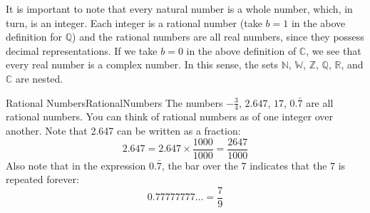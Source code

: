 It is important to note that every natural number is a whole number, which, in turn, is an integer.   Each integer is a rational number (take $b =1$ in the above definition for $\mathbb Q$) and the rational numbers are all real numbers, since they possess decimal representations.   If we take $b=0$ in the above definition of $\mathbb C$, we see that every real number is a complex number.  In this sense, the sets $\mathbb N$, $\mathbb W$, $\mathbb Z$, $\mathbb Q$, $\mathbb R$, and $\mathbb C$ are nested.





\begin{example}{Rational Numbers}{RationalNumbers}
The numbers $-\frac{3}{4}$, $2.647$, $17$, $0.\bar{7}$ are all rational numbers. 
You can think of rational numbers as  of one integer over another. 
Note that 2.647 can be written as a fraction: 
\[ 2.647=2.647\times\frac{1000}{1000}=\frac{2647}{1000} \]
Also note that in the expression $0.\bar{7}$, the bar over the $7$ indicates 
that the $7$ is repeated forever: 
\[ 0.77777777\ldots=\frac{7}{9}\]
\vspace{-0.5cm}
\end{example} 

